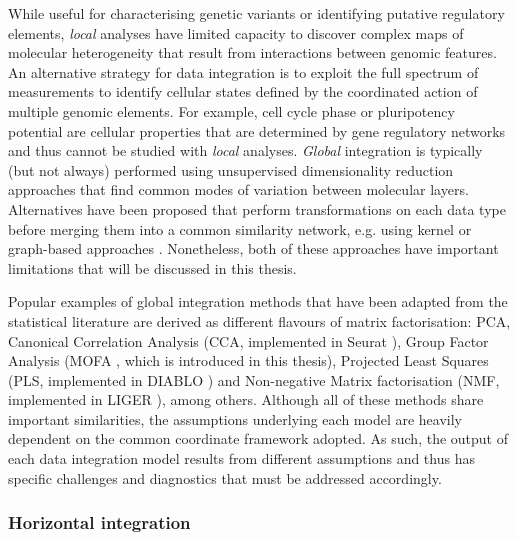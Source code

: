 While useful for characterising genetic variants or identifying putative regulatory elements, \textit{local} analyses have limited capacity to discover complex maps of molecular heterogeneity that result from interactions between genomic features. An alternative strategy for data integration is to exploit the full spectrum of measurements to identify cellular states defined by the coordinated action of multiple genomic elements. For example, cell cycle phase or pluripotency potential are cellular properties that are determined by gene regulatory networks and thus cannot be studied with \textit{local} analyses. \textit{Global} integration is typically (but not always) performed using unsupervised dimensionality reduction approaches that find common modes of variation between molecular layers. Alternatives have been proposed that perform transformations on each data type before merging them into a common similarity network, e.g. using kernel or graph-based approaches \cite{Lanckriet2004, Wang2014}. Nonetheless, both of these approaches have important limitations that will be discussed in this thesis.

Popular examples of global integration methods that have been adapted from the statistical literature are derived as different flavours of matrix factorisation: PCA, Canonical Correlation Analysis (CCA, implemented in Seurat \cite{Butler2018}), Group Factor Analysis (MOFA \cite{Argelaguet2018,Argelaguet2019}, which is introduced in this thesis), Projected Least Squares (PLS, implemented in DIABLO \cite{Singh2018}) and Non-negative Matrix factorisation (NMF, implemented in LIGER \cite{Welch2019}), among others. Although all of these methods share important similarities, the assumptions underlying each model are heavily dependent on the common coordinate framework adopted. As such, the output of each data integration model results from different assumptions and thus has specific challenges and diagnostics that must be addressed accordingly.

\subsubsection{Horizontal integration}

